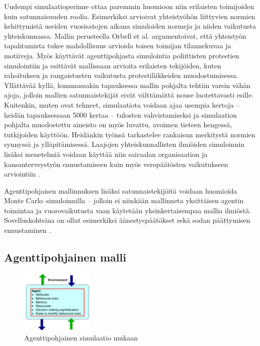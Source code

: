 \documentclass[finnish,gradu,twoside,12pt]{tktltiki}
\begin{document}
Uudempi simulaatioperinne ottaa paremmin huomioon niin erilaisten toimijoiden kuin satunnaisuuden roolia. Esimerkiksi \citet{orbell2004machiavellian} arvioivat yhteistyöhön liittyvien normien kehittymistä useiden vuosisatojen aikana simuloiden normeja ja niiden vaikutusta yhteiskunnassa. Mallin perusteella Orbell et al. argumentoivat, että yhteistyön tapahtumista tukee mahdollisuus arvioida toisen toimijan tilannekuvaa ja motiiveja. Myös \citet{altaweel2012mobilizing} käyttävät agenttipohjasta simulointia poliittisten protestien simulointiin ja esittävät mallissaan arvioita erilaisten tekijöiden, kuten rahoituksen ja rangaistusten vaikutusta protestiliikkeiden muodostumisessa. Yllättävää kyllä, kummassakin tapauksessa mallin pohjalta tehtiin varsin vähän ajoja, jolloin mallien satunnaistekijät eivät välttämättä nouse luotettavasti esille. Kuitenkin, muten \citet{Villatoro2013} ovat tehneet, simulaatiota voidaan ajaa usempia kertoja -- heidän tapauksessaan 5000 kertaa -- tulosten vahvistamiseksi ja simulaation pohjalta muodostettu aineisto on myös luvattu, avoimen tieteen hengessä, tutkijoiden käyttöön. Heidänkin työnsä tarkastelee rankaisun merkitystä normien synnyssä ja ylläpitämisessä. Laajojen yhteiskunnallisten ilmiöiden simuloinnin lisäksi menetelmiä voidaan käyttää niin sairaalan organisaation ja kansanterveystyön ennustamiseen \citep{Pearson2011} kuin myös veropäätösten vaikutukseen arviointiin \citep{bloomquist2006comparison}.

Agenttipohjaisen mallinnuksen lisäksi satunnaistekijöitä voidaan huomioida Monte Carlo--simuloinnilla -- jolloin ei niinkään mallinneta yksittäisen agentin toimintaa ja vuorovaikutusta vaan käytetään yksinkertaisempaa mallia ilmiöstä. Sovelluskohteina on ollut esimerkiksi äänestyspäätökset \citep{quinn1999voter,jackman2000estimation} sekä sodan päättymisen ennustaminen \citep{slantchev2004initiators}.
 
\subsection{Agenttipohjainen malli}

\begin{figure}
\includegraphics[height=3cm]{images/agenttimalli.png} 
\caption{Agenttipohjainen simulaatio \citet{Macal2009} mukaan}
\end{figure}
\end{document}
